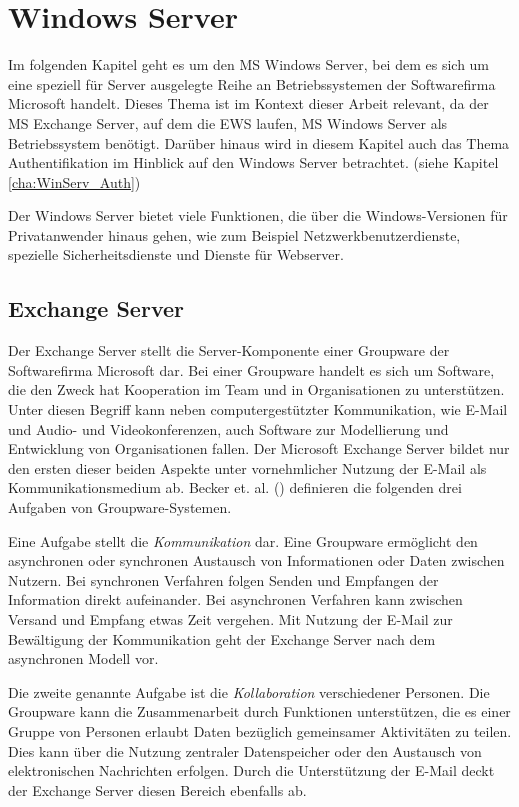 \chapter{Windows Server}
\label{cha:Windows Server}
Im folgenden Kapitel geht es um den \ac{MS} Windows Server, bei dem es sich um eine speziell für Server ausgelegte Reihe an Betriebssystemen der Softwarefirma Microsoft handelt. Dieses Thema ist im Kontext dieser Arbeit relevant, da der \ac{MS} Exchange Server, auf dem die \ac{EWS} laufen, \ac{MS} Windows Server als Betriebssystem benötigt. Darüber hinaus wird in diesem Kapitel auch das Thema Authentifikation im Hinblick auf den Windows Server betrachtet. (siehe Kapitel \ref{cha:WinServ_Auth})

Der Windows Server bietet viele Funktionen, die über die Windows-Versionen für Privatanwender hinaus gehen, wie zum Beispiel Netzwerkbenutzerdienste, spezielle Sicherheitsdienste und Dienste für Webserver. \cite{Boddenberg.2014}

\section{Exchange Server}
\label{cha:WinServ_ExchServ}
Der Exchange Server stellt die Server-Komponente einer Groupware der Softwarefirma Microsoft dar. \cite[S. 3]{Becker.2014}
Bei einer Groupware handelt es sich um Software, die den Zweck hat Kooperation im Team und in Organisationen zu unterstützen. Unter diesen Begriff kann neben computergestützter Kommunikation, wie E-Mail und Audio- und Videokonferenzen, auch Software zur Modellierung und Entwicklung von Organisationen fallen. \cite[S. 1-2]{Wagner.2013} Der Microsoft Exchange Server bildet nur den ersten dieser beiden Aspekte unter vornehmlicher Nutzung der E-Mail als Kommunikationsmedium ab. Becker et. al. (\citeyear[S. 2-3]{Becker.2014}) definieren die folgenden drei Aufgaben von Groupware-Systemen.

Eine Aufgabe stellt die \emph{Kommunikation} dar. Eine Groupware ermöglicht den asynchronen oder synchronen Austausch von Informationen oder Daten zwischen Nutzern. Bei synchronen Verfahren folgen Senden und Empfangen der Information direkt aufeinander. Bei asynchronen Verfahren kann zwischen Versand und Empfang etwas Zeit vergehen. Mit Nutzung der E-Mail zur Bewältigung der Kommunikation geht der Exchange Server nach dem asynchronen Modell vor. \cite[S. 1]{PankokeBabatz.2001}

Die zweite genannte Aufgabe ist die \emph{Kollaboration} verschiedener Personen. \cite[S. 2]{Becker.2014}  Die Groupware kann die Zusammenarbeit durch Funktionen unterstützen, die es einer Gruppe von Personen erlaubt Daten bezüglich gemeinsamer Aktivitäten zu teilen. Dies kann über die Nutzung zentraler Datenspeicher oder den Austausch von elektronischen Nachrichten erfolgen. \cite{Pizano.} Durch die Unterstützung der E-Mail deckt der Exchange Server diesen Bereich ebenfalls ab.

